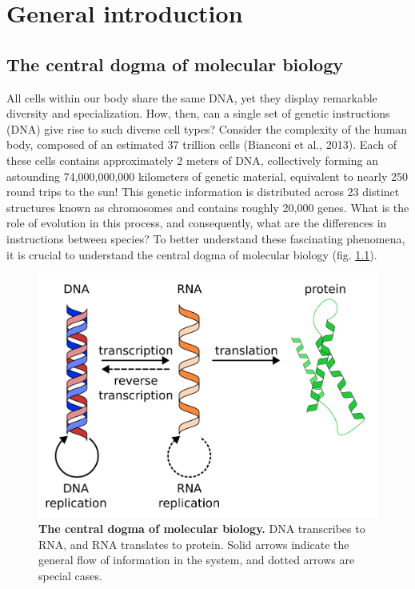\chapter{General introduction}\thumbforchapter
\newpage

\section{The central dogma of molecular biology}

All cells within our body share the same DNA, yet they display remarkable diversity and specialization. How, then, can a single set of genetic instructions (DNA) give rise to such diverse cell types? Consider the complexity of the human body, composed of an estimated 37 trillion cells (Bianconi et al., 2013). Each of these cells contains approximately 2 meters of DNA, collectively forming an astounding 74,000,000,000 kilometers of genetic material, equivalent to nearly 250 round trips to the sun! This genetic information is distributed across 23 distinct structures known as chromosomes and contains roughly 20,000 genes. What is the role of evolution in this process, and consequently, what are the differences in instructions between species? To better understand these fascinating phenomena, it is crucial to understand the central dogma of molecular biology (fig. \ref{fig:central_dogma}).

\begin{figure}[H]
    \center
    \includegraphics[width=0.7\linewidth]{ch.introduction/imgs/central_dogma.png}
    \caption{\textbf{The central dogma of molecular biology.} DNA transcribes to RNA, and RNA translates to protein. Solid arrows indicate the general flow of information in the system, and dotted arrows are special cases.}
    \label{fig:central_dogma}
\end{figure}

